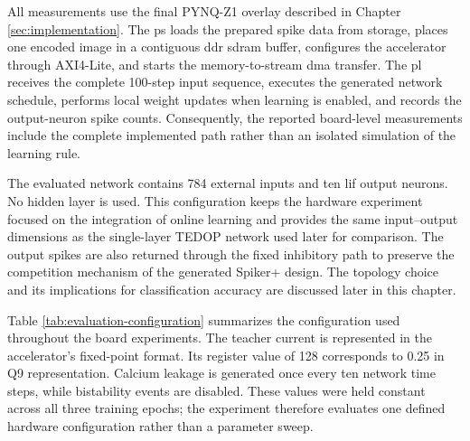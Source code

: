 All measurements use the final PYNQ-Z1 overlay described in Chapter \ref{sec:implementation}. The \gls{ps} loads the prepared spike data from storage, places one encoded image in a contiguous \gls{ddr} \gls{sdram} buffer, configures the accelerator through AXI4-Lite, and starts the memory-to-stream \gls{dma} transfer. The \gls{pl} receives the complete 100-step input sequence, executes the generated network schedule, performs local weight updates when learning is enabled, and records the output-neuron spike counts. Consequently, the reported board-level measurements include the complete implemented path rather than an isolated simulation of the learning rule.

The evaluated network contains 784 external inputs and ten \gls{lif} output neurons. No hidden layer is used. This configuration keeps the hardware experiment focused on the integration of online learning and provides the same input--output dimensions as the single-layer TEDOP network used later for comparison. The output spikes are also returned through the fixed inhibitory path to preserve the competition mechanism of the generated Spiker+ design. The topology choice and its implications for classification accuracy are discussed later in this chapter.

Table \ref{tab:evaluation-configuration} summarizes the configuration used throughout the board experiments. The teacher current is represented in the accelerator's fixed-point format. Its register value of 128 corresponds to 0.25 in Q9 representation. Calcium leakage is generated once every ten network time steps, while bistability events are disabled. These values were held constant across all three training epochs; the experiment therefore evaluates one defined hardware configuration rather than a parameter sweep.

